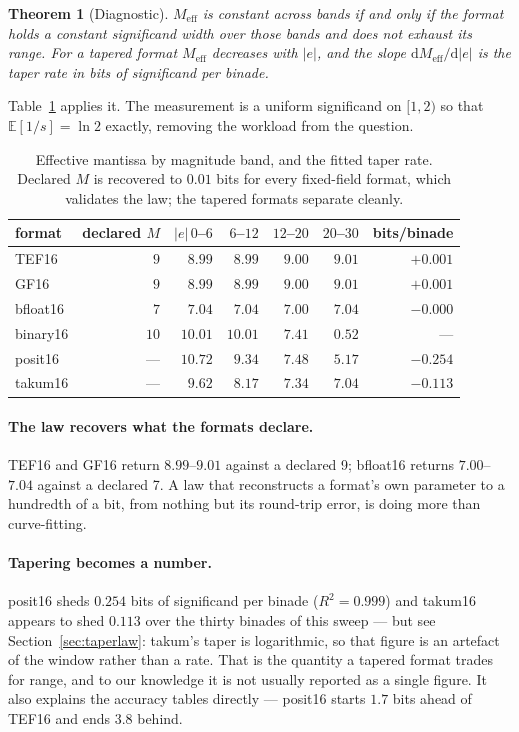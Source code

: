 \documentclass[11pt]{article}
\newtheorem{theorem}{Theorem}
\theoremstyle{definition}
\begin{document}
\begin{theorem}[Diagnostic]\label{thm:diag}
$M_{\mathrm{eff}}$ is constant across bands if and only if the format holds a
constant significand width over those bands and does not exhaust its range. For a
tapered format $M_{\mathrm{eff}}$ decreases with $|e|$, and the slope
$\mathrm{d}M_{\mathrm{eff}}/\mathrm{d}|e|$ is the taper rate in bits of
significand per binade.
\end{theorem}

Table~\ref{tab:meff} applies it. The measurement is a uniform significand on
$[1,2)$ so that $\mathbb{E}[1/s] = \ln 2$ exactly, removing the workload from the
question.

\begin{table}[t]\centering
\caption{Effective mantissa by magnitude band, and the fitted taper rate. Declared
$M$ is recovered to $0.01$ bits for every fixed-field format, which validates the
law; the tapered formats separate cleanly.}
\label{tab:meff}
\begin{tabular}{lrrrrrr}
\toprule
format & declared $M$ & $|e|\,0$--$6$ & $6$--$12$ & $12$--$20$ & $20$--$30$ & bits/binade \\
\midrule
TEF16   & $9$  & $8.99$  & $8.99$ & $9.00$ & $9.01$ & $+0.001$ \\
GF16     & $9$  & $8.99$  & $8.99$ & $9.00$ & $9.01$ & $+0.001$ \\
bfloat16 & $7$  & $7.04$  & $7.04$ & $7.00$ & $7.04$ & $-0.000$ \\
binary16 & $10$ & $10.01$ & $10.01$ & $7.41$ & $0.52$ & --- \\
posit16  & ---  & $10.72$ & $9.34$ & $7.48$ & $5.17$ & $\mathbf{-0.254}$ \\
takum16  & ---  & $9.62$  & $8.17$ & $7.34$ & $7.04$ & $\mathbf{-0.113}$ \\
\bottomrule
\end{tabular}
\end{table}

\paragraph{The law recovers what the formats declare.} TEF16 and GF16 return
$8.99$--$9.01$ against a declared 9; bfloat16 returns $7.00$--$7.04$ against a
declared 7. A law that reconstructs a format's own parameter to a hundredth of a
bit, from nothing but its round-trip error, is doing more than curve-fitting.

\paragraph{Tapering becomes a number.} posit16 sheds $0.254$ bits of significand
per binade ($R^2 = 0.999$) and takum16 appears to shed $0.113$ over the thirty
binades of this sweep --- but see Section~\ref{sec:taperlaw}: takum's taper is
logarithmic, so that figure is an artefact of the window rather than a rate. That is the
quantity a tapered format trades for range, and to our knowledge it is not usually
reported as a single figure. It also explains the accuracy tables directly ---
posit16 starts $1.7$ bits ahead of TEF16 and ends $3.8$ behind.
\end{document}

